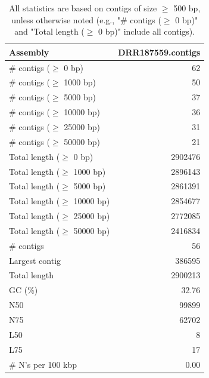 \documentclass[12pt,a4paper]{article}
\begin{document}
\begin{table}[ht]
\begin{center}
\caption{All statistics are based on contigs of size $\geq$ 500 bp, unless otherwise noted (e.g., "\# contigs ($\geq$ 0 bp)" and "Total length ($\geq$ 0 bp)" include all contigs).}
\begin{tabular}{|l*{1}{|r}|}
\hline
Assembly & DRR187559.contigs \\ \hline
\# contigs ($\geq$ 0 bp) & 62 \\ \hline
\# contigs ($\geq$ 1000 bp) & 50 \\ \hline
\# contigs ($\geq$ 5000 bp) & 37 \\ \hline
\# contigs ($\geq$ 10000 bp) & 36 \\ \hline
\# contigs ($\geq$ 25000 bp) & 31 \\ \hline
\# contigs ($\geq$ 50000 bp) & 21 \\ \hline
Total length ($\geq$ 0 bp) & 2902476 \\ \hline
Total length ($\geq$ 1000 bp) & 2896143 \\ \hline
Total length ($\geq$ 5000 bp) & 2861391 \\ \hline
Total length ($\geq$ 10000 bp) & 2854677 \\ \hline
Total length ($\geq$ 25000 bp) & 2772085 \\ \hline
Total length ($\geq$ 50000 bp) & 2416834 \\ \hline
\# contigs & 56 \\ \hline
Largest contig & 386595 \\ \hline
Total length & 2900213 \\ \hline
GC (\%) & 32.76 \\ \hline
N50 & 99899 \\ \hline
N75 & 62702 \\ \hline
L50 & 8 \\ \hline
L75 & 17 \\ \hline
\# N's per 100 kbp & 0.00 \\ \hline
\end{tabular}
\end{center}
\end{table}
\end{document}
